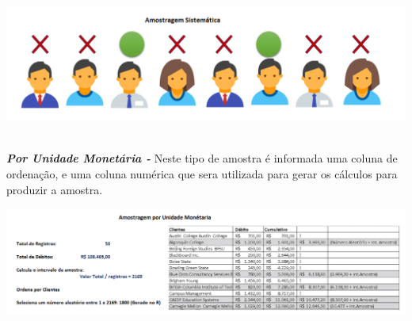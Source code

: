 \documentclass[12pt,a4paper]{article}
\begin{document}
{\centering \includegraphics[scale=0.45]{Amostragem/amostragemSistematica.png} \par}

\newpage

\textbf{\textit{\\Por Unidade Monetária -}}
Neste tipo de amostra é informada uma coluna de ordenação, e uma coluna numérica que sera utilizada 
para gerar os cálculos para produzir a amostra.

{\centering \includegraphics[scale=0.45]{Amostragem/amostragemPorUnidadeMonetaria.png} \par}

	
\end{document}
